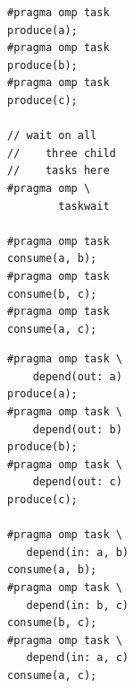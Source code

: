 \begin{figure}

\newsavebox{\firstExample}
\newsavebox{\secondExample}

\begin{lrbox}{\firstExample}
\begin{minipage}{0.45\columnwidth}
\begin{verbatim}
#pragma omp task
produce(a);
#pragma omp task
produce(b);
#pragma omp task
produce(c);

// wait on all
//    three child
//    tasks here
#pragma omp \
        taskwait

#pragma omp task
consume(a, b);
#pragma omp task
consume(b, c);
#pragma omp task
consume(a, c);
\end{verbatim}
\end{minipage}
\end{lrbox}

\begin{lrbox}{\secondExample}
\begin{minipage}{0.50\columnwidth}
\begin{verbatim}
#pragma omp task \
    depend(out: a)
produce(a);
#pragma omp task \
    depend(out: b)
produce(b);
#pragma omp task \
    depend(out: c)
produce(c);

#pragma omp task \
   depend(in: a, b)
consume(a, b);
#pragma omp task \
   depend(in: b, c)
consume(b, c);
#pragma omp task \
   depend(in: a, c)
consume(a, c);
\end{verbatim}
\end{minipage}
\end{lrbox}



\subfloat[][OpenMP 3.0]{\usebox{\firstExample}\label{fig:CodeTaskDeps3.0code}}
~
~
\subfloat[][OpenMP 4.0]{\usebox{\secondExample}\label{fig:CodeTaskDeps4.0code}}

\addtocounter{subfigure}{-1}


\end{figure}
